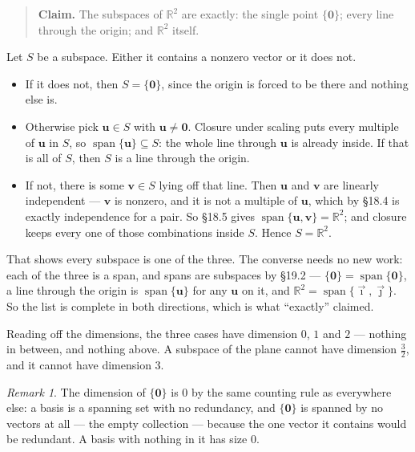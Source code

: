 \documentclass[11pt]{article}
\theoremstyle{definition}
\theoremstyle{remark}
\newtheorem*{rmk}{Remark}
\newcommand{\R}{\mathbb{R}}
\newcommand{\vc}[1]{\mathbf{#1}}
\newcommand{\ivec}{\vec{\imath}}
\newcommand{\jvec}{\vec{\jmath}}
\DeclareMathOperator{\spanop}{span}   %
\begin{document}
\begin{quote}
\textbf{Claim.} The subspaces of $\R^{2}$ are exactly: the single point
$\{\vc{0}\}$; every line through the origin; and $\R^{2}$ itself.
\end{quote}

\noindent Let $S$ be a subspace. Either it contains a nonzero vector or it does
not.

\begin{itemize}[leftmargin=1.4em,itemsep=4pt]
  \item If it does not, then $S=\{\vc{0}\}$, since the origin is forced to be
        there and nothing else is.
  \item Otherwise pick $\vc{u}\in S$ with $\vc{u}\neq\vc{0}$. Closure under
        scaling puts every multiple of $\vc{u}$ in $S$, so
        $\spanop\{\vc{u}\}\subseteq S$: the whole line through $\vc{u}$ is
        already inside. If that is all of $S$, then $S$ is a line through the
        origin.
  \item If not, there is some $\vc{v}\in S$ lying off that line. Then $\vc{u}$
        and $\vc{v}$ are linearly independent --- $\vc{v}$ is nonzero, and it is
        not a multiple of $\vc{u}$, which by \S18.4 is exactly independence for
        a pair. So \S18.5 gives $\spanop\{\vc{u},\vc{v}\}=\R^{2}$; and closure
        keeps every one of those combinations inside $S$. Hence $S=\R^{2}$.
\end{itemize}

\noindent That shows every subspace is one of the three. The converse needs no
new work: each of the three is a span, and spans are subspaces by \S19.2 ---
$\{\vc{0}\}=\spanop\{\vc{0}\}$, a line through the origin is $\spanop\{\vc{u}\}$
for any $\vc{u}$ on it, and $\R^{2}=\spanop\{\ivec,\jvec\}$. So the list is
complete in both directions, which is what ``exactly'' claimed.

Reading off the dimensions, the three cases have dimension $0$, $1$
and $2$ --- nothing in between, and nothing above. A subspace of the plane
cannot have dimension $\tfrac32$, and it cannot have dimension $3$.

\begin{rmk}
The dimension of $\{\vc{0}\}$ is $0$ by the same counting rule as everywhere
else: a basis is a spanning set with no redundancy, and $\{\vc{0}\}$ is spanned
by no vectors at all --- the empty collection --- because the one vector it
contains would be redundant. A basis with nothing in it has size $0$.
\end{rmk}
\end{document}
